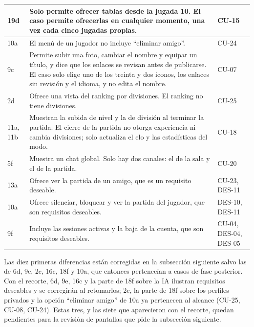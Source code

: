 \begin{center}
\begin{longtable}{|L{0.13\textwidth}|L{0.61\textwidth}|L{0.16\textwidth}|}
19d & Solo permite ofrecer tablas desde la jugada 10. El caso permite ofrecerlas en cualquier momento, una vez cada cinco jugadas propias. & \mbox{CU-15} \\ \hline
10a & El menú de un jugador no incluye ``eliminar amigo''. & \mbox{CU-24} \\ \hline
9c & Permite subir una foto, cambiar el nombre y equipar un título, y dice que los enlaces se revisan antes de publicarse. El caso solo elige uno de los treinta y dos iconos, los enlaces sin revisión y el idioma, y no edita el nombre. & \mbox{CU-07} \\ \hline
2d & Ofrece una vista del ranking por divisiones. El ranking no tiene divisiones. & \mbox{CU-25} \\ \hline
11a, 11b & Muestran la subida de nivel y la de división al terminar la partida. El cierre de la partida no otorga experiencia ni cambia divisiones; solo actualiza el elo y las estadísticas del modo. & \mbox{CU-18} \\ \hline
5f & Muestra un chat global. Solo hay dos canales: el de la sala y el de la partida. & \mbox{CU-20} \\ \hline
13a & Ofrece ver la partida de un amigo, que es un requisito deseable. & \mbox{CU-23}, \mbox{DES-11} \\ \hline
10a & Ofrece silenciar, bloquear y ver la partida del jugador, que son requisitos deseables. & \mbox{DES-10}, \mbox{DES-11} \\ \hline
9f & Incluye las sesiones activas y la baja de la cuenta, que son requisitos deseables. & \mbox{CU-04}, \mbox{DES-04}, \mbox{DES-05} \\ \hline
\end{longtable}
\end{center}

Las diez primeras diferencias están corregidas en la subsección siguiente salvo las de 6d, 9e, 2c, 16c, 18f y 10a, que entonces pertenecían a casos de fase posterior. Con el recorte, 6d, 9e, 16c y la parte de 18f sobre la IA ilustran requisitos deseables y se corregirán al retomarlos; 2c, la parte de 18f sobre los perfiles privados y la opción ``eliminar amigo'' de 10a ya pertenecen al alcance (\mbox{CU-25}, \mbox{CU-08}, \mbox{CU-24}). Estas tres, y las siete que aparecieron con el recorte, quedan pendientes para la revisión de pantallas que pide la subsección siguiente.




